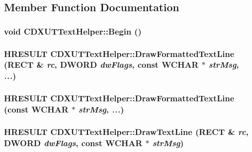 \subsection{Member Function Documentation}
\hypertarget{class_c_d_x_u_t_text_helper_af89af0e0f1384754d03b5461f0d7f722}{
\subsubsection[{Begin}]{\setlength{\rightskip}{0pt plus 5cm}void CDXUTTextHelper::Begin ()}}
\label{class_c_d_x_u_t_text_helper_af89af0e0f1384754d03b5461f0d7f722}
\hypertarget{class_c_d_x_u_t_text_helper_ad6d92ed3fe48d59442e33a4366830479}{
\subsubsection[{DrawFormattedTextLine}]{\setlength{\rightskip}{0pt plus 5cm}HRESULT CDXUTTextHelper::DrawFormattedTextLine (RECT \& {\em rc}, \/  DWORD {\em dwFlags}, \/  const WCHAR $\ast$ {\em strMsg}, \/   {\em ...})}}
\label{class_c_d_x_u_t_text_helper_ad6d92ed3fe48d59442e33a4366830479}
\hypertarget{class_c_d_x_u_t_text_helper_ac0a795044c9d27c5d2163af1f41423d4}{
\subsubsection[{DrawFormattedTextLine}]{\setlength{\rightskip}{0pt plus 5cm}HRESULT CDXUTTextHelper::DrawFormattedTextLine (const WCHAR $\ast$ {\em strMsg}, \/   {\em ...})}}
\label{class_c_d_x_u_t_text_helper_ac0a795044c9d27c5d2163af1f41423d4}
\hypertarget{class_c_d_x_u_t_text_helper_ab0bfaac9948007694f0dbecfe8dc6aba}{
\subsubsection[{DrawTextLine}]{\setlength{\rightskip}{0pt plus 5cm}HRESULT CDXUTTextHelper::DrawTextLine (RECT \& {\em rc}, \/  DWORD {\em dwFlags}, \/  const WCHAR $\ast$ {\em strMsg})}}
